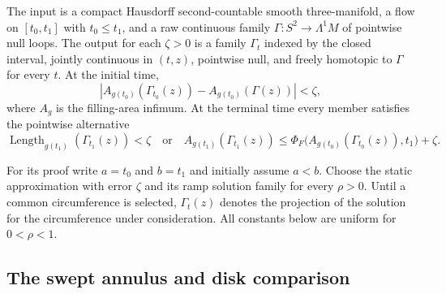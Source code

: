 \begin{theorem}
\label{thm:loop-family-deformation}
The input is a compact Hausdorff second-countable smooth three-manifold, a flow on
$[t_0,t_1]$ with $t_0\le t_1$, and a raw continuous family
$\Gamma:S^2\to\Lambda^1M$ of pointwise null loops.  The output for each
$\zeta>0$ is a family $\Gamma_t$ indexed by the closed interval, jointly
continuous in $(t,z)$, pointwise null, and freely homotopic to $\Gamma$ for
every $t$.  At the initial time,
\begin{equation}
 \left|A_{g(t_0)}(\Gamma_{t_0}(z))-
        A_{g(t_0)}(\Gamma(z))\right|<\zeta,
 \label{eq:initial-area-error}
\end{equation}
where $A_g$ is the filling-area infimum.  At the terminal time every member
satisfies the pointwise alternative
\begin{equation}
 \operatorname{Length}_{g(t_1)}(\Gamma_{t_1}(z))<\zeta
 \quad\text{or}\quad
 A_{g(t_1)}(\Gamma_{t_1}(z))
 \le \Phi_{F}\bigl(A_{g(t_0)}(\Gamma_{t_0}(z)),t_1\bigr)+\zeta.
 \label{eq:terminal-alternative}
\end{equation}
\end{theorem}

For its proof write $a=t_0$ and $b=t_1$ and initially assume $a<b$.
Choose the static approximation with error $\zeta$ and its ramp solution
family for every $\rho>0$.  Until a common circumference is selected,
$\Gamma_t(z)$ denotes the projection of the solution for the circumference
under consideration.  All constants below are uniform for $0<\rho<1$.

\subsection{The swept annulus and disk comparison}
\label{sec:swept-area}

